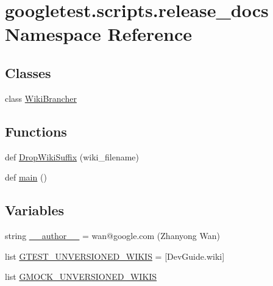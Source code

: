 \hypertarget{namespacegoogletest_1_1scripts_1_1release__docs}{}\section{googletest.\+scripts.\+release\+\_\+docs Namespace Reference}
\label{namespacegoogletest_1_1scripts_1_1release__docs}
\subsection*{Classes}
\begin{DoxyCompactItemize}
\item 
class \mbox{\hyperlink{classgoogletest_1_1scripts_1_1release__docs_1_1_wiki_brancher}{Wiki\+Brancher}}
\end{DoxyCompactItemize}
\subsection*{Functions}
\begin{DoxyCompactItemize}
\item 
def \mbox{\hyperlink{namespacegoogletest_1_1scripts_1_1release__docs_a83d0803170297b8d381e1d602f95e0e3}{Drop\+Wiki\+Suffix}} (wiki\+\_\+filename)
\item 
def \mbox{\hyperlink{namespacegoogletest_1_1scripts_1_1release__docs_af26c181b4053dab1906a5a20e9be9e56}{main}} ()
\end{DoxyCompactItemize}
\subsection*{Variables}
\begin{DoxyCompactItemize}
\item 
string \mbox{\hyperlink{namespacegoogletest_1_1scripts_1_1release__docs_a1aaddf6a50ed46fae64701f4322208b2}{\+\_\+\+\_\+author\+\_\+\+\_\+}} = \textquotesingle{}wan@google.\+com (Zhanyong Wan)\textquotesingle{}
\item 
list \mbox{\hyperlink{namespacegoogletest_1_1scripts_1_1release__docs_a6ba6e2968a5fefecf7ed0cfd55f85aed}{G\+T\+E\+S\+T\+\_\+\+U\+N\+V\+E\+R\+S\+I\+O\+N\+E\+D\+\_\+\+W\+I\+K\+IS}} = \mbox{[}\textquotesingle{}Dev\+Guide.\+wiki\textquotesingle{}\mbox{]}
\item 
list \mbox{\hyperlink{namespacegoogletest_1_1scripts_1_1release__docs_a8b57a1659682435ab16fadfbe7f61660}{G\+M\+O\+C\+K\+\_\+\+U\+N\+V\+E\+R\+S\+I\+O\+N\+E\+D\+\_\+\+W\+I\+K\+IS}}
\end{DoxyCompactItemize}


